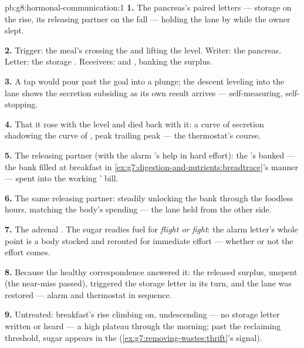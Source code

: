 \begin{solution}{pb:g8:hormonal-communication:1}
\textbf{1.} The pancreas's paired letters --- storage
 on the rise, its releasing partner on the fall
--- holding the lane by  while the owner slept.

\textbf{2.} Trigger: the meal's  crossing the
 and lifting the  level. Writer: the pancreas.
Letter: the storage . Receivers:  and
, banking the surplus.

\textbf{3.} A tap would pour past the goal into a
plunge; the descent leveling into the lane shows the
secretion subsiding as its own result arrives ---
self-measuring, self-stopping.

\textbf{4.} That it rose with the level and died back
with it: a curve of secretion shadowing the curve of
, peak trailing peak --- the thermostat's course.

\textbf{5.} The releasing partner (with the alarm
's help in hard effort): the 's banked
 --- the bank filled at breakfast in
\cref{ex:g7:digestion-and-nutrients:breadtrace}'s
manner --- spent into the working ' bill.

\textbf{6.} The same releasing partner: steadily
unlocking the bank through the foodless hours, matching
the body's spending --- the lane held from the other
side.

\textbf{7.} The adrenal . The sugar readies fuel
for \emph{flight or fight}: the alarm letter's whole
point is a body stocked and rerouted for immediate
effort --- whether or not the effort comes.

\textbf{8.} Because the healthy correspondence answered
it: the released surplus, unspent (the near-miss passed),
triggered the storage letter in its turn, and the lane
was restored --- alarm and thermostat in sequence.

\textbf{9.} Untreated: breakfast's rise climbing on,
undescending --- no storage letter written or heard ---
a high plateau through the morning; past the reclaiming
threshold, sugar appears in the 
(\cref{ex:g7:removing-wastes:thrift}'s signal).


\end{solution}
